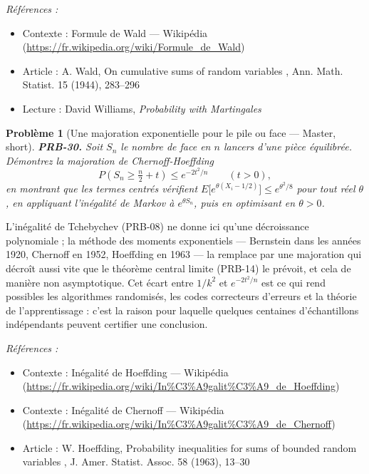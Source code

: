 \documentclass[11pt]{article}
\newtheorem{problem}{Problème}
\newenvironment{refs}{\par\small\noindent\emph{Références :}\begin{itemize}\setlength\itemsep{0pt}}{\end{itemize}\normalsize}
\begin{document}
\begin{refs}
\item Contexte : Formule de Wald --- Wikipédia (\url{https://fr.wikipedia.org/wiki/Formule_de_Wald})
\item Article : A. Wald, \og{} On cumulative sums of random variables \fg{}, Ann. Math. Statist. 15 (1944), 283--296
\item Lecture : David Williams, \textit{Probability with Martingales}
\end{refs}

\bigskip

\begin{problem}[{Une majoration exponentielle pour le pile ou face --- Master, short}]
\textbf{PRB-30.} Soit $ S_n $ le nombre de \og{} face \fg{} en $ n $ lancers d'une
pièce équilibrée. Démontrez la majoration de Chernoff-Hoeffding
\[ P\!\left( S_n \ge \tfrac{n}{2} + t \right) \le e^{-2t^2/n} \qquad (t > 0), \]
en montrant que les termes centrés vérifient $ E\big[e^{\theta (X_i - 1/2)}\big] \le
e^{\theta^2/8} $ pour tout réel $ \theta $, en appliquant l'inégalité de Markov à
$ e^{\theta S_n} $, puis en optimisant en $ \theta > 0 $.
\end{problem}

\noindent L'inégalité de Tchebychev (PRB-08) ne donne ici qu'une décroissance
polynomiale ; la méthode des moments exponentiels --- Bernstein dans les années 1920, Chernoff en
1952, Hoeffding en 1963 --- la remplace par une majoration qui décroît aussi vite que le théorème
central limite (PRB-14) le prévoit, et cela de manière non asymptotique. Cet écart entre
$ 1/k^2 $ et $ e^{-2t^2/n} $ est ce qui rend possibles les algorithmes randomisés, les codes
correcteurs d'erreurs et la théorie de l'apprentissage : c'est la raison pour laquelle quelques
centaines d'échantillons indépendants peuvent certifier une conclusion.

\begin{refs}
\item Contexte : Inégalité de Hoeffding --- Wikipédia (\url{https://fr.wikipedia.org/wiki/In%C3%A9galit%C3%A9_de_Hoeffding})
\item Contexte : Inégalité de Chernoff --- Wikipédia (\url{https://fr.wikipedia.org/wiki/In%C3%A9galit%C3%A9_de_Chernoff})
\item Article : W. Hoeffding, \og{} Probability inequalities for sums of bounded random variables \fg{}, J. Amer. Statist. Assoc. 58 (1963), 13--30
\end{refs}
\end{document}
